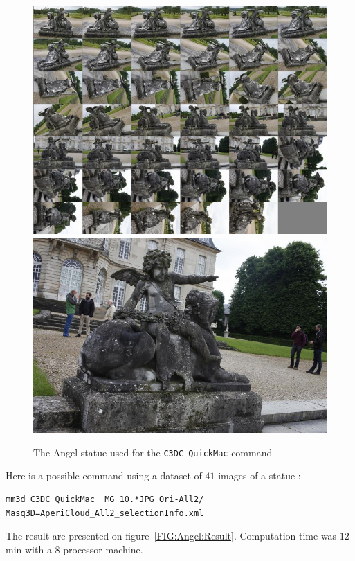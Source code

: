 \begin{figure}[H]
\begin{center}
\includegraphics[width=120mm]{FIGS/Ange/Panel.jpg}
\includegraphics[width=120mm]{FIGS/Ange/SMALL_MG_1044.JPG}
\end{center}
\caption{The Angel statue used for the {\tt C3DC QuickMac} command}
\label{FIG:Angel:Flog}
\end{figure}


Here is a possible command using a dataset of $41$ images of a statue :


\begin{verbatim}
mm3d C3DC QuickMac _MG_10.*JPG Ori-All2/ Masq3D=AperiCloud_All2_selectionInfo.xml
\end{verbatim}


The result are presented on figure~\ref{FIG:Angel:Result}. Computation time was $12$ min with a $8$ processor machine.




